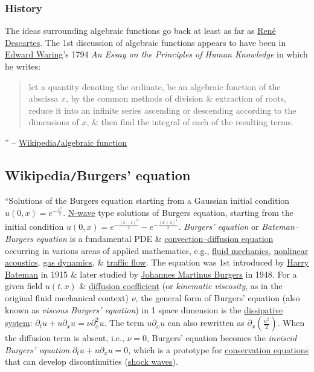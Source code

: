 \documentclass{article}
\begin{document}
\subsubsection{History}
The ideas surrounding algebraic functions go back at least as far as \href{https://en.wikipedia.org/wiki/Ren%C3%A9_Descartes}{\sc Ren\'e Descartes}. The 1st discussion of algebraic functions appears to have been in \href{https://en.wikipedia.org/wiki/Edward_Waring}{Edward Waring}'s 1794 {\it An Essay on the Principles of Human Knowledge} in which he writes:
\begin{quote}
	let a quantity denoting the ordinate, be an algebraic function of the abscissa $x$, by the common methods of division \& extraction of roots, reduce it into an infinite series ascending or descending according to the dimensions of $x$, \& then find the integral of each of the resulting terms.
\end{quote}
'' -- \href{https://en.wikipedia.org/wiki/Algebraic_function}{Wikipedia{\tt/}algebraic function}


\subsection{Wikipedia{\tt/}Burgers' equation}
``{\sf Solutions of the Burgers equation starting from a Gaussian initial condition $u(0,x) = e^{-\frac{x^2}{2}}$. \href{https://en.wikipedia.org/wiki/N-wave}{N-wave} type solutions of Burgers equation, starting from the initial condition $u(0,x) = e^{-\frac{(x - 1)^2}{2}} - e^{-\frac{(x + 1)^2}{2}}$.} {\it Burgers' equation} or {\it Bateman--Burgers equation} is a fundamental PDE \& \href{https://en.wikipedia.org/wiki/Convection%E2%80%93diffusion_equation}{convection--diffusion equation} occurring in various areas of applied mathematics, e.g., \href{https://en.wikipedia.org/wiki/Fluid_mechanics}{fluid mechanics}, \href{https://en.wikipedia.org/wiki/Nonlinear_acoustics}{nonlinear acoustics}, \href{https://en.wikipedia.org/wiki/Gas_dynamics}{gas dynamics}, \& \href{https://en.wikipedia.org/wiki/Traffic_flow}{traffic flow}. The equation was 1st introduced by \href{https://en.wikipedia.org/wiki/Harry_Bateman}{\sc Harry Bateman} in 1915 \& later studied by \href{https://en.wikipedia.org/wiki/Johannes_Martinus_Burgers}{\sc Johannes Martinus Burgers} in 1948. For a given field $u(t,x)$ \& \href{https://en.wikipedia.org/wiki/Diffusion_coefficient}{diffusion coefficient} (or {\it kinematic viscosity}, as in the original fluid mechanical context) $\nu$, the general form of Burgers' equation (also known as {\it viscous Burgers' equation}) in 1 space dimension is the \href{https://en.wikipedia.org/wiki/Dissipative_system}{dissipative system}: $\partial_tu + u\partial_xu = \nu\partial_x^2u$. The term $u\partial_xu$ can also rewritten as $\partial_x\left(\frac{u^2}{2}\right)$. When the diffusion term is absent, i.e., $\nu = 0$, Burgers' equation becomes the {\it inviscid Burgers' equation} $\partial_tu + u\partial_xu = 0$, which is a prototype for \href{https://en.wikipedia.org/wiki/Conservation_law}{conservation equations} that can develop discontinuities (\href{https://en.wikipedia.org/wiki/Shock_wave}{shock waves}).
\end{document}
